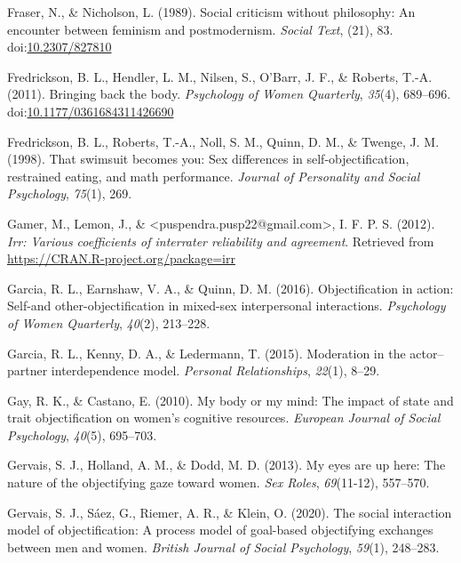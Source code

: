 \documentclass[
  man]{apa6}
\begin{document}
\leavevmode\hypertarget{ref-frasernicholson1989}{}%
Fraser, N., \& Nicholson, L. (1989). Social criticism without philosophy: An encounter between feminism and postmodernism. \emph{Social Text}, (21), 83. doi:\href{https://doi.org/10.2307/827810}{10.2307/827810}

\leavevmode\hypertarget{ref-fredricksonetal2011}{}%
Fredrickson, B. L., Hendler, L. M., Nilsen, S., O'Barr, J. F., \& Roberts, T.-A. (2011). Bringing back the body. \emph{Psychology of Women Quarterly}, \emph{35}(4), 689--696. doi:\href{https://doi.org/10.1177/0361684311426690}{10.1177/0361684311426690}

\leavevmode\hypertarget{ref-fredrickson1998swimsuit}{}%
Fredrickson, B. L., Roberts, T.-A., Noll, S. M., Quinn, D. M., \& Twenge, J. M. (1998). That swimsuit becomes you: Sex differences in self-objectification, restrained eating, and math performance. \emph{Journal of Personality and Social Psychology}, \emph{75}(1), 269.

\leavevmode\hypertarget{ref-R-irr}{}%
Gamer, M., Lemon, J., \& \textless puspendra.pusp22@gmail.com\textgreater, I. F. P. S. (2012). \emph{Irr: Various coefficients of interrater reliability and agreement}. Retrieved from \url{https://CRAN.R-project.org/package=irr}

\leavevmode\hypertarget{ref-garcia2016objectification}{}%
Garcia, R. L., Earnshaw, V. A., \& Quinn, D. M. (2016). Objectification in action: Self-and other-objectification in mixed-sex interpersonal interactions. \emph{Psychology of Women Quarterly}, \emph{40}(2), 213--228.

\leavevmode\hypertarget{ref-garcia2015moderation}{}%
Garcia, R. L., Kenny, D. A., \& Ledermann, T. (2015). Moderation in the actor--partner interdependence model. \emph{Personal Relationships}, \emph{22}(1), 8--29.

\leavevmode\hypertarget{ref-gay2010my}{}%
Gay, R. K., \& Castano, E. (2010). My body or my mind: The impact of state and trait objectification on women's cognitive resources. \emph{European Journal of Social Psychology}, \emph{40}(5), 695--703.

\leavevmode\hypertarget{ref-gervais2013my}{}%
Gervais, S. J., Holland, A. M., \& Dodd, M. D. (2013). My eyes are up here: The nature of the objectifying gaze toward women. \emph{Sex Roles}, \emph{69}(11-12), 557--570.

\leavevmode\hypertarget{ref-gervais2020social}{}%
Gervais, S. J., Sáez, G., Riemer, A. R., \& Klein, O. (2020). The social interaction model of objectification: A process model of goal-based objectifying exchanges between men and women. \emph{British Journal of Social Psychology}, \emph{59}(1), 248--283.
\end{document}
